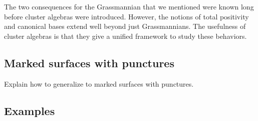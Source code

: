 The two consequences for the Grassmannian that we mentioned were known long before
cluster algebras were introduced. However, the notions of total positivity and
canonical bases extend well beyond just Grassmannians. The usefulness of cluster
algebras is that they give a unified framework to study these behaviors.

\subsection{Marked surfaces with punctures}\label{sec:triangulations_of_surfaces}

Explain how to generalize to marked surfaces with punctures.

\subsection{Examples}

